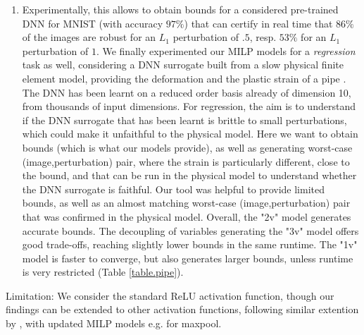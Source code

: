 \begin{enumerate}
\item Experimentally, this allows to obtain bounds for a considered pre-trained DNN for MNIST (with accuracy $97\%$) that can certify in real time that $86\%$ of the images are robust for an $L_1$ perturbation of $.5$, resp. $53\%$ for an $L_1$ perturbation of $1$. We finally experimented our MILP models for a {\em regression} task as well, considering a DNN surrogate built from a slow physical finite element model, providing the deformation and the plastic strain of a pipe \cite{aiware}. The DNN has been learnt on a reduced order basis already of dimension 10, from thousands of input dimensions. For regression, the aim is to understand if the DNN surrogate that has been learnt is brittle to small perturbations, which could make it unfaithful to the physical model. Here we want to obtain bounds (which is what our models provide), as well as generating worst-case (image,perturbation) pair, where the strain is particularly different, close to the bound, and that can be run in the physical model to understand whether the DNN surrogate is faithful. Our tool was helpful to provide limited bounds, as well as an almost matching worst-case (image,perturbation) pair that was confirmed in the physical model.
Overall, the "2v" model generates accurate bounds. The decoupling of variables generating the "3v" model offers good trade-offs, reaching slightly lower bounds in the same runtime. 
The "1v" model is faster to converge, but also generates larger bounds, unless runtime is very restricted (Table \ref{table.pipe}).
\end{enumerate}

Limitation: We consider the standard ReLU activation function, though our findings can be extended to other activation functions, following similar extention by \cite{DivideAndSlide}, with updated MILP models e.g. for maxpool. 




